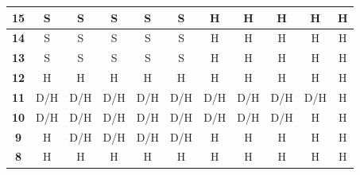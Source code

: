 \documentclass[conference]{IEEEtran}
\begin{document}
\begin{table}[htbp]
\begin{tabular}{|c|c|c|c|c|c|c|c|c|c|c|}
\textbf{15} & \cellcolor[HTML]{32CB00}S & \cellcolor[HTML]{32CB00}S & \cellcolor[HTML]{32CB00}S & \cellcolor[HTML]{32CB00}S & \cellcolor[HTML]{32CB00}S & \cellcolor[HTML]{FE0000}H & \cellcolor[HTML]{FE0000}H & \cellcolor[HTML]{FE0000}H & \cellcolor[HTML]{FE0000}H & \cellcolor[HTML]{FE0000}H \\ \hline
\textbf{14} & \cellcolor[HTML]{32CB00}S & \cellcolor[HTML]{32CB00}S & \cellcolor[HTML]{32CB00}S & \cellcolor[HTML]{32CB00}S & \cellcolor[HTML]{32CB00}S & \cellcolor[HTML]{FE0000}H & \cellcolor[HTML]{FE0000}H & \cellcolor[HTML]{FE0000}H & \cellcolor[HTML]{FE0000}H & \cellcolor[HTML]{FE0000}H \\ \hline
\textbf{13} & \cellcolor[HTML]{32CB00}S & \cellcolor[HTML]{32CB00}S & \cellcolor[HTML]{32CB00}S & \cellcolor[HTML]{32CB00}S & \cellcolor[HTML]{32CB00}S & \cellcolor[HTML]{FE0000}H & \cellcolor[HTML]{FE0000}H & \cellcolor[HTML]{FE0000}H & \cellcolor[HTML]{FE0000}H & \cellcolor[HTML]{FE0000}H \\ \hline
\textbf{12} & \cellcolor[HTML]{FE0000}H & \cellcolor[HTML]{FE0000}H & \cellcolor[HTML]{FE0000}H & \cellcolor[HTML]{FE0000}H & \cellcolor[HTML]{FE0000}H & \cellcolor[HTML]{FE0000}H & \cellcolor[HTML]{FE0000}H & \cellcolor[HTML]{FE0000}H & \cellcolor[HTML]{FE0000}H & \cellcolor[HTML]{FE0000}H \\ \hline
\textbf{11} & \cellcolor[HTML]{FFC702}D/H & \cellcolor[HTML]{FFC702}D/H & \cellcolor[HTML]{FFC702}D/H & \cellcolor[HTML]{FFC702}D/H & \cellcolor[HTML]{FFC702}D/H & \cellcolor[HTML]{FFC702}D/H & \cellcolor[HTML]{FFC702}D/H & \cellcolor[HTML]{FFC702}D/H & \cellcolor[HTML]{FFC702}D/H & \cellcolor[HTML]{FE0000}H \\ \hline
\textbf{10} & \cellcolor[HTML]{FFC702}D/H & \cellcolor[HTML]{FFC702}D/H & \cellcolor[HTML]{FFC702}D/H & \cellcolor[HTML]{FFC702}D/H & \cellcolor[HTML]{FFC702}D/H & \cellcolor[HTML]{FFC702}D/H & \cellcolor[HTML]{FFC702}D/H & \cellcolor[HTML]{FFC702}D/H & \cellcolor[HTML]{FE0000}H & \cellcolor[HTML]{FE0000}H \\ \hline
\textbf{9} & \cellcolor[HTML]{FE0000}H & \cellcolor[HTML]{FFC702}D/H & \cellcolor[HTML]{FFC702}D/H & \cellcolor[HTML]{FFC702}D/H & \cellcolor[HTML]{FFC702}D/H & \cellcolor[HTML]{FE0000}H & \cellcolor[HTML]{FE0000}H & \cellcolor[HTML]{FE0000}H & \cellcolor[HTML]{FE0000}H & \cellcolor[HTML]{FE0000}H \\ \hline
\textbf{8} & \cellcolor[HTML]{FE0000}H & \cellcolor[HTML]{FE0000}H & \cellcolor[HTML]{FE0000}H & \cellcolor[HTML]{FE0000}H & \cellcolor[HTML]{FE0000}H & \cellcolor[HTML]{FE0000}H & \cellcolor[HTML]{FE0000}H & \cellcolor[HTML]{FE0000}H & \cellcolor[HTML]{FE0000}H & \cellcolor[HTML]{FE0000}H \\ \hline

\end{tabular}
\end{table}
\end{document}
